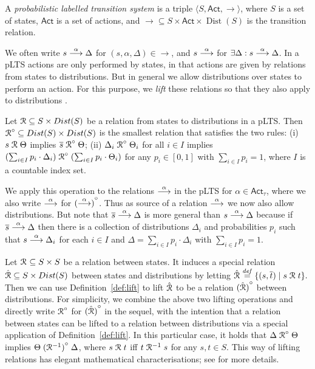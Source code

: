 \documentclass[a4paper,UKenglish,cleveref, autoref]{lipics-v2019}
\newcommand{\define}{\stackrel{\it def}=}
\newcommand{\dist}[1]{\mathop{Dist} ({#1})   } %
\newcommand{\pdist}[1]{\overline{#1}  } %
\newcommand{\lift}[1]{\mathrel{{#1}^\circ}}
\newcommand{\Act}{\ensuremath{\mathsf{Act}}\xspace}
\begin{document}
\begin{definition}\label{def:LTS}
	A \emph{probabilistic labelled transition system}
	is a triple
	$\langle S, \Act,  \rightarrow  \rangle$, where
	$S$ is a set of states,
	$\Act$ is a set of actions, and $\rightarrow \subseteq
	S \times \Act \times \dist{S}$ is the transition relation.
\end{definition}

We often write $s\mathrel{\stackrel{\alpha}{\longrightarrow}}\Delta$ for $(s,\alpha,\Delta)\in\rightarrow$, and $s\mathrel{\stackrel{\alpha}{\longrightarrow}}$ for $\exists \Delta: s\mathrel{\stackrel{\alpha}{\longrightarrow}}\Delta$.
In a pLTS actions are only performed by states, in that actions are
given by relations from states to distributions. But in general we
allow distributions over states to perform an action. For this
purpose, we \emph{lift} these relations so that they also apply to
distributions \cite{DGHM09}.
\begin{definition}\label{def:lift}
	Let  $\mathord{\aRel} \subseteq
	S\times\dist{S}$ be a relation from states to distributions in a pLTS.
	Then $\mathord{\lift{\aRel}} \subseteq \dist{S} \times
	\dist{S}$ is the smallest relation that satisfies the two rules:
	(i) $s \mathrel{{\mathcal R }} \Theta$ implies $\pdist{s} \lift{\aRel} \Theta$;
	(ii) $\Delta_i \lift{\aRel} \Theta_i$ for all $i\in I$ implies
	$(\sum_{i\in I}p_i\cdot\Delta_i)\lift{\aRel}(\sum_{i\in I}p_i\cdot\Theta_i)$
	for any $p_i \in [0,1]$ with $\sum_{i\in I}p_i = 1$, where $I$ is a
	countable index set.
\end{definition}
\noindent

We apply this operation to the relations  $\mathrel{\stackrel{\alpha}{\longrightarrow}}$ in the pLTS
for $\alpha\in \Act_{\tau}$, where we also write $\mathrel{\stackrel{\alpha}{\longrightarrow}}$ for
$\lift{(\ar{\alpha})}$. Thus as source of
a relation $\mathrel{\stackrel{\alpha}{\longrightarrow}}$ we now also allow distributions.
But note that  $\pdist{s} \ar{\alpha} \Delta$ is more general than
$s \mathrel{\stackrel{\alpha}{\longrightarrow}} \Delta$ because if
$\pdist{s}\ar{\alpha}\Delta$ then there is a collection of distributions
$\Delta_i$ and probabilities $p_i$ such that $s\mathrel{\stackrel{\alpha}{\longrightarrow}}\Delta_i$ for each $i\in I$ and
$\Delta=\sum_{i\in I}p_i\cdot\Delta_i$ with $\sum_{i\in I}p_i=1$.

Let $\mathrel{{\mathcal R }}\ \subseteq S \times S$ be a relation between states. It induces a special relation $\hat{\aRel}\subseteq S\times\dist{S}$ between states and distributions by letting
$\hat{\aRel} \define \sset{(s,\pdist{t})\mid s\aRel t}.$
Then we can use Definition~\ref{def:lift} to lift $\hat{\mathrel{{\mathcal R }}}$ to be a relation $\lift{(\hat{\aRel})}$ between distributions. For simplicity, we combine the above two lifting operations and directly write $\lift{\aRel}$ for $\lift{(\hat{\aRel})}$ in the sequel, with the intention that a relation between states can be lifted to a relation between distributions via a special application of Definition~\ref{def:lift}. In this particular case, it holds that $\Delta \lift{\aRel} \Theta$ implies $\Theta \lift{(\aRel^{-1})}\Delta$, where $s \mathrel{{\mathcal R }} t$ iff $t\mathrel{{\mathcal R }}^{-1} s$ for any $s,t\in S$. This way of lifting relations has elegant mathematical characterisations; see \cite{DD11} for more details.
\end{document}
